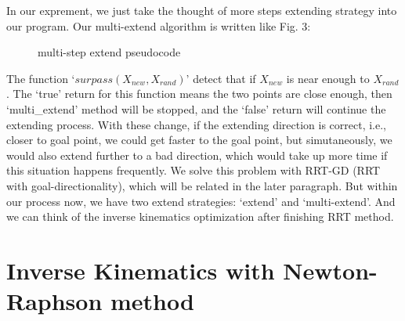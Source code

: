\documentclass[letterpaper, 10 pt, conference]{ieeeconf}  %
\begin{document}
In our exprement, we just take the thought of more steps extending strategy into our program. Our multi-extend algorithm is written like Fig. 3:

\begin{figure}[thpb]
      \centering
      \caption{multi-step extend pseudocode}
      \label{figurelabe3}
\end{figure}

The function `$surpass(X_{new},X_{rand})$' detect that if $X_{new}$ is near enough to $X_{rand}$. The `true' return for this function means the two points are close enough, then `multi\_extend' method will be stopped, and the `false' return will continue the extending process.  With these change, if the extending direction is correct, i.e., closer to goal point, we could get faster to the goal point, but simutaneously, we would also extend further to a bad direction, which would take up more time if this situation happens frequently. We solve this problem with RRT-GD (RRT with goal-directionality), which will be related in the later paragraph. But within our process now, we have two extend strategies: `extend' and `multi-extend'. And we can think of the inverse kinematics optimization after finishing RRT method.

\section{Inverse Kinematics with Newton-Raphson method}
\end{document}
